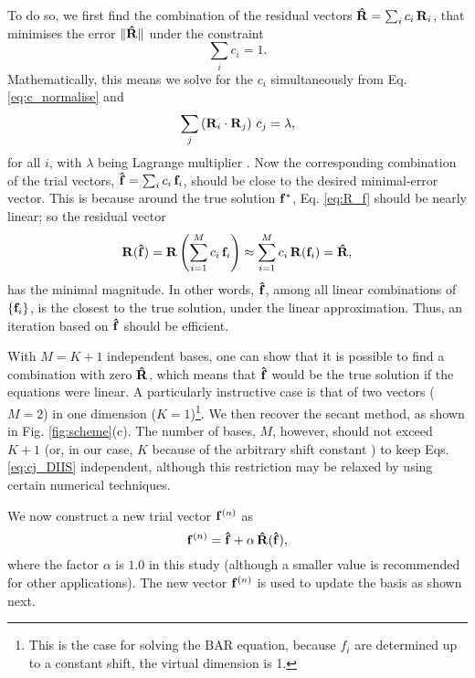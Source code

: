 \documentclass{gMOS2e}
\begin{document}
To do so, we first find the combination of the residual vectors
$\mathbf{\hat R} = \sum_i c_i \, \mathbf{R}_i$,
that minimises the error
$\| \mathbf{\hat R} \|$
under the constraint
\begin{equation}
  \sum_i c_i = 1.
  \label{eq:c_normalise}
\end{equation}
%
Mathematically,
this means  we solve for the $c_i$ simultaneously
from Eq. \eqref{eq:c_normalise} and
%
\begin{equation}
  \sum_j \left( \mathbf{R}_i \cdot \mathbf{R}_j \right) \, c_j = \lambda,
  \label{eq:cj_DIIS}
\end{equation}
%
for all $i$,
with $\lambda$ being  Lagrange multiplier
.
%
Now the corresponding combination
of the trial vectors,
$\mathbf{\hat f} = \sum_i c_i \, \mathbf{f}_i$,
should be close to the desired minimal-error vector.
%
This is because
around the true solution $\mathbf{f}^*$,
Eq. \eqref{eq:R_f} should be nearly linear;
so the residual vector
%
\[
\mathbf{R}(\mathbf{\hat f})
=
\mathbf{R}\left(
  \sum_{i=1}^M c_i \, \mathbf{f}_i
\right)
\approx
\sum_{i=1}^M c_i \, \mathbf{R}(\mathbf{f}_i)
=\mathbf{\hat R},
\]
%
has the minimal magnitude.
%
In other words,
$\mathbf{\hat f}$,
among all linear combinations of $\{ \mathbf{f}_i \}$,
is the closest to the true solution,
under the linear approximation.
%
Thus,
an iteration based on
$\mathbf{\hat f}$
should be efficient.



With $M = K + 1$ independent bases,
one can show that
it is possible to
find a combination with zero $\mathbf{\hat R}$,
which means that
$\mathbf{\hat f}$ would be the true solution
if the equations were linear.
%
A particularly instructive case is that of
two vectors ($M = 2$)
in one dimension ($K = 1$)\footnote{
This is the case for solving the BAR equation,
because $f_i$ are determined up to a constant shift,
the virtual dimension is 1.}.
%
We then recover
the secant method\cite{press},
as shown in Fig. \ref{fig:scheme}(c).
%
The number of bases, $M$, however,
should not exceed $K + 1$
(or, in our case, $K$
because of the arbitrary shift constant )
to keep Eqs. \eqref{eq:cj_DIIS}
independent,
%
although this restriction may be relaxed
by using certain numerical techniques\cite{
press}.




We now construct a new trial vector $\mathbf{f}^{(n)}$ as
%
\begin{equation*}
\mathbf{f}^{(n)}
=
\mathbf{\hat f}
+
\alpha \, \mathbf{\hat R}( \mathbf{\hat f} ),
\end{equation*}
%
where the factor $\alpha$ is $1.0$ in this study
(although a smaller value is recommended
for other applications\cite{kovalenko1999, howard2011}).
%
The new vector $\mathbf{f}^{(n)}$
is used to update the basis as shown next.
\end{document}

